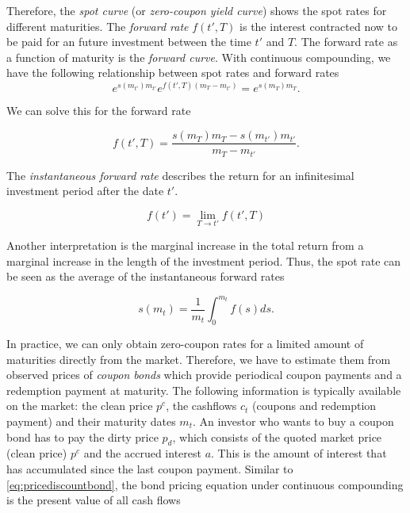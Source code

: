 Therefore, the \emph{spot curve} (or \emph{zero-coupon yield curve}) shows the spot rates for different maturities. The \emph{forward rate} $f(t',T)$ is the interest contracted now to be paid for an future investment between the time $t'$ and $T$. The forward rate as a function of maturity is the \emph{forward curve}. With continuous compounding, we have the following relationship between spot rates and forward rates
\begin{equation*}
  \label{eq:relspotforward}
  e^{s(m_{t'}) m_{t'}}e^{f(t',T)(m_T-m_{t'})} = e^{s(m_T) m_T}.
\end{equation*}

We can solve this for the forward rate

\begin{equation*}
  \label{eq:forwardrate}
  f(t',T) = \frac{s(m_T)m_T - s(m_{t'})m_{t'}}{m_T-m_{t'}}.
\end{equation*}

The \emph{instantaneous forward rate} describes the return for an infinitesimal investment period after the date $t'$.

\begin{equation*}
  \label{eq:instforw}
  f(t') = \lim_{T\rightarrow t'}f(t',T)
\end{equation*}

Another interpretation is the marginal increase in the total return from a marginal increase in the length of the investment period. Thus, the spot rate can be seen as the average of the instantaneous forward rates

\begin{equation}
  \label{eq:avgforwardrate}
  s(m_t)=\frac{1}{m_t}\int_0^{m_t}f(s)ds.
\end{equation}

In practice, we can only obtain zero-coupon rates for a limited amount of maturities directly from the market. Therefore, we have to estimate them from observed prices of \emph{coupon bonds} which provide periodical coupon payments and a redemption payment at maturity. The following information is typically available on the market: the clean price $p^c$, the cashflows $c_t$ (coupons and redemption payment) and their maturity dates $m_t$. An investor who wants to buy a coupon bond has to pay the dirty price $p_d$, which consists of the quoted market price (clean price) $p^c$ and the accrued interest $a$. This is the amount of interest that has accumulated since the last coupon payment. Similar to \eqref{eq:pricediscountbond}, the bond pricing equation under continuous compounding is the present value of all cash flows

